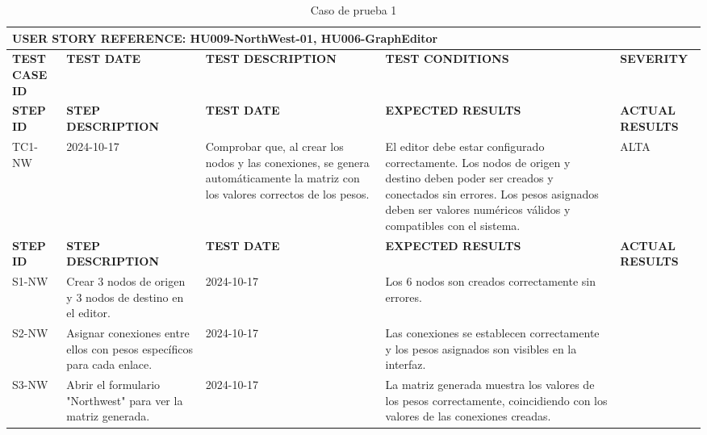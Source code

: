 \documentclass[stu, 12pt, letterpaper, donotrepeattitle, floatsintext, natbib]{apa7}
\begin{document}
\begin{longtable}{|p{2cm}|p{3cm}|p{3cm}|p{3cm}|p{3cm}|}
  \caption{Caso de prueba 1} \label{tab:casos_prueba1} \\
  \hline
  \multicolumn{5}{|l|}{\textbf{USER STORY REFERENCE: HU009-NorthWest-01, HU006-GraphEditor}} \\ \hline
  \textbf{TEST CASE ID} & \textbf{TEST DATE} & \textbf{TEST DESCRIPTION} & \textbf{TEST CONDITIONS} & \textbf{SEVERITY} \\ \hline
  \endfirsthead
  \hline
  \textbf{STEP ID} & \textbf{STEP DESCRIPTION} & \textbf{TEST DATE} & \textbf{EXPECTED RESULTS} & \textbf{ACTUAL RESULTS} \\ \hline
  \endhead
  TC1-NW & 2024-10-17 & Comprobar que, al crear los nodos y las conexiones, se genera automáticamente la matriz con los valores correctos de los pesos. & El editor debe estar configurado correctamente. Los nodos de origen y destino deben poder ser creados y conectados sin errores. Los pesos asignados deben ser valores numéricos válidos y compatibles con el sistema. & ALTA \\ \hline
  \textbf{STEP ID} & \textbf{STEP DESCRIPTION} & \textbf{TEST DATE} & \textbf{EXPECTED RESULTS} & \textbf{ACTUAL RESULTS} \\ \hline
  S1-NW & Crear 3 nodos de origen y 3 nodos de destino en el editor. & 2024-10-17 & Los 6 nodos son creados correctamente sin errores. & \\ \hline
  S2-NW & Asignar conexiones entre ellos con pesos específicos para cada enlace. & 2024-10-17 & Las conexiones se establecen correctamente y los pesos asignados son visibles en la interfaz. & \\ \hline
  S3-NW & Abrir el formulario "Northwest" para ver la matriz generada. & 2024-10-17 & La matriz generada muestra los valores de los pesos correctamente, coincidiendo con los valores de las conexiones creadas. & \\ \hline
\end{longtable}
\end{document}
